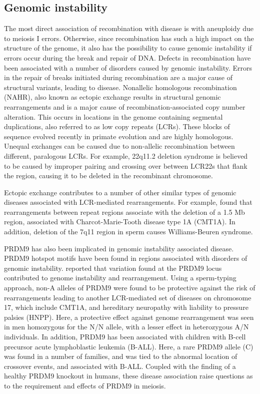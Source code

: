 
\subsection{Genomic instability}
The most direct association of recombination with disease is with aneuploidy due to meiosis I errors\cite{Hassold2001,Hassold2007}.
Otherwise, since recombination has such a high impact on the structure of the genome, it also has the possibility to cause genomic instability if errors occur during the break and repair of DNA.
Defects in recombination have been associated with a number of disorders caused by genomic instability.
Errors in the repair of breaks initiated during recombination are a major cause of structural variants, leading to disease\cite{Carvalho2016}.
Nonallelic homologous recombination (NAHR), also known as ectopic exchange results in structural genomic rearrangements and is a major cause of recombination-associated copy number alteration.
This occurs in locations in the genome containing segmental duplications, also referred to as low copy repeats (LCRs).  
These blocks of sequence evolved recently in primate evolution and are highly homologous.
Unequal exchanges can be caused due to non-allelic recombination between different, paralogous LCRs.  
For example, 22q11.2 deletion syndrome is believed to be caused by improper pairing and crossing over between LCR22s that flank the region, causing it to be deleted in the recombinant chromosome\cite{Emanuel2008}.

Ectopic exchange contributes to a number of other similar types of genomic diseases associated with LCR-mediated rearrangements\cite{Stankiewicz2002,Liu2012}.
For example, \citet{Pentao1992} found that rearrangements between repeat regions associate with the deletion of a 1.5 Mb region, associated with Charcot-Marie-Tooth disease type 1A (CMT1A).
In addition, deletion of the 7q11 region in sperm causes Williams-Beuren syndrome\cite{Turner2008}.

PRDM9 has also been implicated in genomic instability associated disease.
PRDM9 hotspot motifs have been found in regions associated with disorders of genomic instability\cite{Myers2008}.
\citet{Berg2010} reported that variation found at the PRDM9 locus contributed to genome instability and rearrangement.
Using a sperm-typing approach, non-A alleles of PRDM9 were found to be protective against the risk of rearrangements leading to another LCR-mediated set of diseases on chromosome 17, which include CMT1A, and hereditary neuropathy with liability to pressure palsies (HNPP)\cite{Berg2010}.
Here, a protective effect against genome rearrangement was seen in men homozygous for the N/N allele, with a lesser effect in heterozygous A/N individuals.
In addition, PRDM9 has been associated with children with B-cell precursor acute lymphoblastic leukemia (B-ALL)\cite{Hussin2013}.
Here, a rare PRDM9 allele (C) was found in a number of families, and was tied to the abnormal location of crossover events, and associated with B-ALL.
Coupled with the finding of a healthy PRDM9 knockout in humans\cite{Narasimhan2016}, these disease association raise questions as to the requirement and effects of PRDM9 in meiosis.

